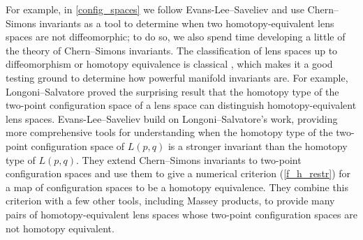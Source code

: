For example, in \cref{config_spaces} we follow Evans-Lee--Saveliev \cite{deletedsquare} and use Chern--Simons
invariants as a tool to determine when two homotopy-equivalent lens spaces are not
diffeomorphic; to do so, we also spend time developing a little of the theory of Chern--Simons invariants. The
classification of lens spaces up to diffeomorphism or homotopy equivalence is classical \cites{Rei35}[\S
5]{Whi41}{Bro60}, which makes it a good testing ground to determine how powerful manifold invariants are. For
example, Longoni--Salvatore \cite{LS05} proved the surprising result that the homotopy type of the two-point
configuration space of a lens space can distinguish homotopy-equivalent lens spaces.  Evans-Lee--Saveliev build on
Longoni--Salvatore's work, providing more comprehensive tools for understanding when the homotopy type of the
two-point configuration space of $L(p, q)$ is a stronger invariant than the homotopy type of $L(p, q)$. They extend
Chern--Simons invariants to two-point configuration spaces and use them to give a numerical criterion
(\cref{f_h_restr}) for a map of configuration spaces to be a homotopy equivalence. They combine this criterion with
a few other tools, including Massey products, to provide many pairs of homotopy-equivalent lens spaces whose
two-point configuration spaces are not homotopy equivalent.

